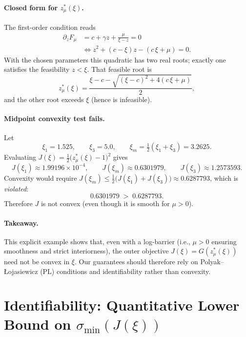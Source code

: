 \documentclass[11pt]{article}
\theoremstyle{remark}
\begin{document}
\paragraph{Closed form for $z_\mu^*(\xi)$.}
The first-order condition reads
\begin{align*}
\partial_z F_\mu &= c+\gamma z + \frac{\mu}{\xi-z}=0 \\
&\Longleftrightarrow z^2 + (c-\xi)z - (c\,\xi+\mu)=0.
\end{align*}
With the chosen parameters this quadratic has two real roots; exactly one satisfies the feasibility $z<\xi$. That feasible root is
\begin{equation*}
z_\mu^*(\xi)=\frac{\xi - c - \sqrt{(\xi - c)^2 + 4(c\,\xi+\mu)}}{2},
\end{equation*}
and the other root exceeds $\xi$ (hence is infeasible).

\paragraph{Midpoint convexity test fails.}
Let
\begin{equation*}
\xi_1=1.525,\qquad \xi_3=5.0,\qquad \xi_m=\tfrac12(\xi_1+\xi_3)=3.2625.
\end{equation*}
Evaluating $J(\xi)=\tfrac12\big(z_\mu^*(\xi)-1\big)^2$ gives
\begin{equation*}
J(\xi_1)\approx 1.99196\times 10^{-4},\qquad
J(\xi_m)\approx 0.6301979,\qquad
J(\xi_3)\approx 1.2573593.
\end{equation*}
Convexity would require $J(\xi_m)\le \tfrac12\big(J(\xi_1)+J(\xi_3)\big)\approx 0.6287793$, which is \emph{violated}:
\begin{equation*}
0.6301979\;>\;0.6287793.
\end{equation*}
Therefore $J$ is not convex (even though it is smooth for $\mu>0$).

\paragraph{Takeaway.}
This explicit example shows that, even with a log-barrier (i.e., $\mu>0$ ensuring smoothness and strict interiorness), the outer objective $J(\xi)=G(z_\mu^*(\xi))$ need not be convex in $\xi$. Our guarantees should therefore rely on Polyak--Łojasiewicz (PL) conditions and identifiability rather than convexity.

\section{Identifiability: Quantitative Lower Bound on $\sigma_{\min}(J(\xi))$}
\label{sec:identifiability_lower_bound}
\end{document}
